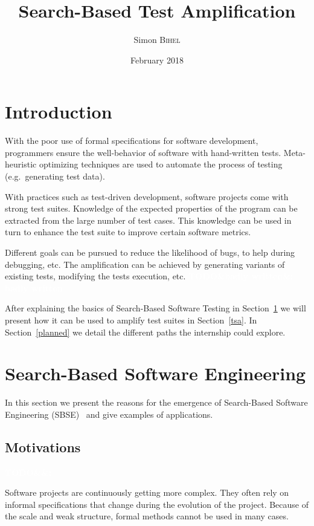 \documentclass[11pt]{sdm}
\title{Search-Based Test Amplification}
\author{Simon \textsc{Bihel}}
\date{February 2018}
\newcommand{\todo}[1]{\colorbox{Red!75}{\textcolor{white}{\textbf{TODO\ifx&#1&\else: #1\fi}}}}
\begin{document}
\maketitle

\section*{Introduction}
\label{intro}

With the poor use of formal specifications for software development, programmers ensure the well-behavior of software with hand-written tests.
Meta-heuristic optimizing techniques are used to automate the process of testing (e.g.\ generating test data).

With practices such as test-driven development, software projects come with strong test suites.
Knowledge of the expected properties of the program can be extracted from the large number of test cases.
This knowledge can be used in turn to enhance the test suite to improve certain software metrics.

Different goals can be pursued to reduce the likelihood of bugs, to help during debugging, etc.
The amplification can be achieved by generating variants of existing tests, modifying the tests execution, etc.
\todo{badly written}

After explaining the basics of Search-Based Software Testing in Section~\ref{sbse} we will present how it can be used to amplify test suites in Section~\ref{tsa}.
In Section~\ref{planned} we detail the different paths the internship could explore.


\section{Search-Based Software Engineering}
\label{sbse}

In this section we present the reasons for the emergence of Search-Based Software Engineering (SBSE)~\cite{harman2001search,mcminn2011search} and give examples of applications.

\subsection{Motivations}
\label{motiv}
\todo{}

Software projects are continuously getting more complex.
They often rely on informal specifications that change during the evolution of the project.
Because of the scale and weak structure, formal methods cannot be used in many cases.
\end{document}

